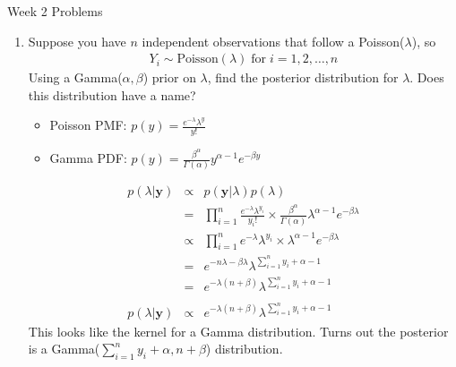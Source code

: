 \documentclass[10pt,a4paper]{article}
\author{Patrick Lam}
\newcommand{\red}{\color{red}}
\begin{document}
\begin{center}
\begin{Large}Week 2 Problems\end{Large}
\end{center}
\bigskip
\begin{enumerate}


\item Suppose you have $n$ independent observations that follow a Poisson($\lambda$), so
\begin{eqnarray*}
Y_i \sim \mathrm{Poisson}(\lambda) \; \mathrm{for} \; i = 1,2,\dots,n
\end{eqnarray*}
Using a Gamma($\alpha, \beta$) prior on $\lambda$, find the posterior distribution for $\lambda$.  Does this distribution have a name?

\begin{itemize}
\item Poisson PMF: $p(y) = \frac{e^{-\lambda} \lambda^y}{y!}$
\item Gamma PDF: $p(y) = \frac{\beta^{\alpha}}{\Gamma(\alpha)} y^{\alpha-1} e^{-\beta y}$
\end{itemize}

\medskip
\red
\begin{eqnarray*}
p(\lambda | \mathbf{y}) &\propto& p(\mathbf{y} | \lambda) p(\lambda) \\
&=& \prod_{i=1}^n \frac{e^{-\lambda} \lambda^{y_i}}{y_i!} \times \frac{\beta^{\alpha}}{\Gamma(\alpha)} \lambda^{\alpha-1} e^{-\beta \lambda}\\
&\propto& \prod_{i=1}^n e^{-\lambda} \lambda^{y_i} \times \lambda^{\alpha-1} e^{-\beta \lambda}\\
&=& e^{-n\lambda - \beta \lambda} \lambda^{\sum_{i=1}^n y_i + \alpha - 1} \\
&=& e^{-\lambda (n+\beta)} \lambda^{\sum_{i=1}^n y_i + \alpha - 1} \\\\
p(\lambda | \mathbf{y}) &\propto& e^{-\lambda (n+\beta)} \lambda^{\sum_{i=1}^n y_i + \alpha - 1} 
\end{eqnarray*}
This looks like the kernel for a Gamma distribution.  Turns out the posterior is a Gamma($\sum_{i=1}^n y_i + \alpha, n+\beta$) distribution.
\end{enumerate}
\end{document}
